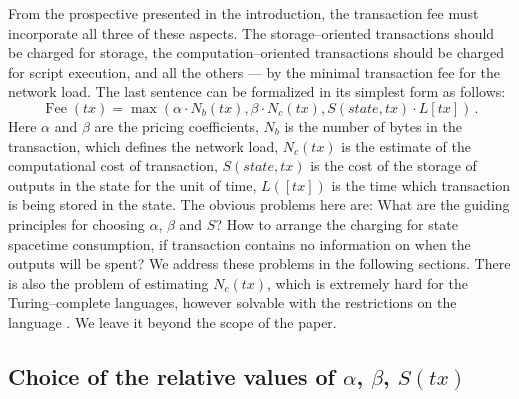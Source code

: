\documentclass[]{llncs}   %
\newcommand{\authnote}[2]{\marginpar{\parbox{\marginparwidth}{\tiny %
  \textsf{#1 {\textcolor{blue}{notes: #2}}}}}%
  \textcolor{blue}{\textbf{\dag}}}
\newcommand{\authnote}[2]{
  \textsf{#1\textcolor{blue}{ #2}}}
\newcommand{\authnote}[2]{}
\newcommand{\vk}[1]{{\authnote{\textcolor{red}{V:}}{#1}}}
\begin{document}
From the prospective presented in the introduction, the transaction fee must
incorporate all three of these aspects. The storage--oriented transactions should
be charged for storage, the computation--oriented transactions should be charged
for script execution, and all the others --- by the minimal transaction fee for
the network load. The last sentence can be formalized in its simplest form as follows:
\begin{equation}
    \operatorname{Fee}(tx) = \max(\alpha \cdot N_b(tx), \beta \cdot N_c(tx),
    S(state,tx) \cdot L[tx])\,.
    \label{eq:max}
\end{equation}
Here $\alpha$ and $\beta$ are the pricing coefficients, $N_b$ is the
number of bytes in the transaction, which defines the network load, $N_c(tx)$ is
the estimate of the computational cost of transaction, $S(state,tx)$ is the cost of
the storage of outputs in the state for the unit of time, $L([tx])$ is the time which
transaction is being stored in the state. \vk{Oops. Do we mean now that if the
    transaction frees the space in the state, the corresponding output can be
stored forever? If yes, it cancels vast part of the reasoning: I create $tx_0$ with
two outputs; in the next block $tx_1$ merging them, and store the output of
$tx_1$ for free.} The obvious problems here are: What are the guiding principles
for choosing $\alpha$, $\beta$ and $S$? How to arrange the charging for state
spacetime consumption, if transaction contains no information on when the
outputs will be spent? We address these problems in the following sections.
There is also the problem of estimating $N_c(tx)$, which is extremely hard \vk{or
unsolvable?} \vk{How hard, does anybody know the specific name of this problem?}
for the Turing--complete languages, however solvable with the restrictions on the
language\vk{citations, which restrictions, or stick to one existing}. We leave
it beyond the scope of the paper.

\subsection{Choice of the relative values of $\alpha$, $\beta$, $S(tx)$}
\end{document}
